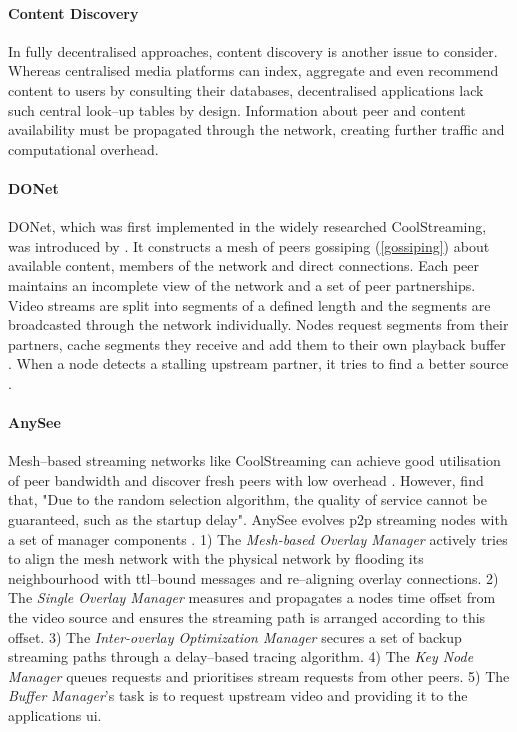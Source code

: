 \paragraph{Content Discovery}
In fully decentralised approaches, content discovery is another issue to consider. Whereas centralised media platforms can index, aggregate and even recommend content to users by consulting their databases, decentralised applications lack such central look–up tables by design. Information about peer and content availability must be propagated through the network, creating further traffic and computational overhead.

\paragraph{DONet}
DONet, which was first implemented in the widely researched CoolStreaming, was introduced by \citet{coolstreaming}. It constructs a mesh of peers gossiping (\ref{gossiping}) about available content, members of the network and direct connections. Each peer maintains an incomplete view of the network and a set of peer partnerships. Video streams are split into segments of a defined length and the segments are broadcasted through the network individually. Nodes request segments from their partners, cache segments they receive and add them to their own playback buffer \cite[\S{III.B}]{coolstreaming}. When a node detects a stalling upstream partner, it tries to find a better source \cite[\S{IV.A}]{coolstreaming-design-theory}.

\paragraph{AnySee}
Mesh–based streaming networks like CoolStreaming can achieve good utilisation of peer bandwidth and discover fresh peers with low overhead \cite[\S{II}]{anysee}. However, \citet[\S{III}]{anysee} find that, "Due to the random selection algorithm, the quality of service cannot be guaranteed, such as the startup delay". AnySee evolves \gls{p2p} streaming nodes with a set of manager components \citep[\S{III.B-F}]{anysee}. 1) The \textit{Mesh-based Overlay Manager} actively tries to align the mesh network with the physical network by flooding its neighbourhood with \gls{ttl}–bound messages and re–aligning overlay connections. 2) The \textit{Single Overlay Manager} measures and propagates a nodes time offset from the video source and ensures the streaming path is arranged according to this offset. 3) The \textit{Inter-overlay Optimization Manager} secures a set of backup streaming paths through a delay–based tracing algorithm. 4) The \textit{Key Node Manager} queues requests and prioritises stream requests from other peers. 5) The \textit{Buffer Manager}'s task is to request upstream video and providing it to the applications \gls{ui}.

